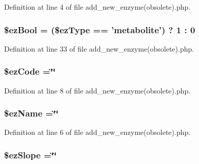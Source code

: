 Definition at line 4 of file add\-\_\-new\-\_\-enzyme(obsolete).\-php.

\hypertarget{add__new__enzyme_07obsolete_08_8php_ae824a6c0e1560b8ae6c0bdd6fd460078}{
\subsubsection[{\$ez\-Bool}]{\setlength{\rightskip}{0pt plus 5cm}\$ez\-Bool = (\$ez\-Type == 'metabolite') ? 1 \-: 0}}\label{add__new__enzyme_07obsolete_08_8php_ae824a6c0e1560b8ae6c0bdd6fd460078}


Definition at line 33 of file add\-\_\-new\-\_\-enzyme(obsolete).\-php.

\hypertarget{add__new__enzyme_07obsolete_08_8php_a1a28f4870dd5aff7acdc3184a85a30c7}{
\subsubsection[{\$ez\-Code}]{\setlength{\rightskip}{0pt plus 5cm}\$ez\-Code =\char`\"{}\char`\"{}}}\label{add__new__enzyme_07obsolete_08_8php_a1a28f4870dd5aff7acdc3184a85a30c7}


Definition at line 8 of file add\-\_\-new\-\_\-enzyme(obsolete).\-php.

\hypertarget{add__new__enzyme_07obsolete_08_8php_a57a9615262224b8dda435a084ba02406}{
\subsubsection[{\$ez\-Name}]{\setlength{\rightskip}{0pt plus 5cm}\${\bf ez\-Name} =\char`\"{}\char`\"{}}}\label{add__new__enzyme_07obsolete_08_8php_a57a9615262224b8dda435a084ba02406}


Definition at line 6 of file add\-\_\-new\-\_\-enzyme(obsolete).\-php.

\hypertarget{add__new__enzyme_07obsolete_08_8php_a1efbb279669bdab5d5eaff4f289c71a2}{
\subsubsection[{\$ez\-Slope}]{\setlength{\rightskip}{0pt plus 5cm}\$ez\-Slope =\char`\"{}\char`\"{}}}\label{add__new__enzyme_07obsolete_08_8php_a1efbb279669bdab5d5eaff4f289c71a2}


